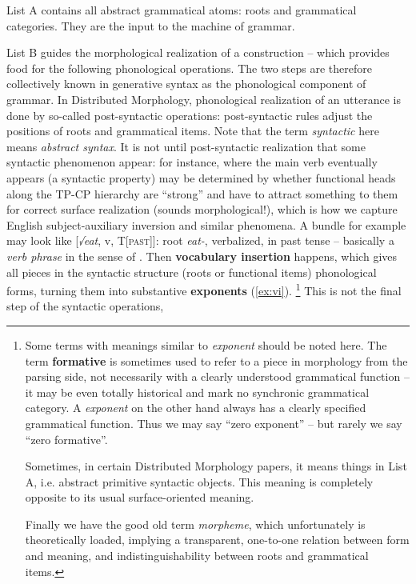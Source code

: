 \documentclass[a4paper, oneside, scheme=plain, 12pt]{article}
\newcommand*{\concept}[1]{\textbf{#1}}
\newcommand*{\term}[1]{\emph{#1}}
\newcommand{\form}[1]{\emph{#1}}
\newcommand*{\category}[1]{\textsc{#1}}
\begin{document}
List A contains all abstract grammatical atoms:
roots and grammatical categories.
They are the input to the machine of grammar.


List B guides the morphological realization of a construction --
which provides food for the following phonological operations.
The two steps are therefore collectively known in generative syntax as the phonological component of grammar.
In Distributed Morphology, phonological realization of an utterance
is done by so-called post-syntactic operations:
post-syntactic rules adjust the positions of roots and grammatical items.
Note that the term \term{syntactic} here means \emph{abstract syntax}.
It is not until post-syntactic realization that some syntactic phenomenon appear:
for instance, where the main verb eventually appears (a syntactic property) may be determined by
whether functional heads along the TP-CP hierarchy are ``strong''
and have to attract something to them for correct surface realization
(sounds morphological!),
which is how we capture English subject-auxiliary inversion and similar phenomena.
A bundle for example may look like [\form{√eat}, v, T[\category{past}]]:
root \form{eat-}, verbalized, in past tense -- basically a \term{verb phrase}
in the sense of .
Then \concept{vocabulary insertion} happens,
which gives all pieces in the syntactic structure (roots or functional items) phonological forms,
turning them into substantive \concept{exponents} (\ref{ex:vi}).%
\footnote{
    Some terms with meanings similar to \term{exponent} should be noted here.
    The term \concept{formative} is sometimes used to refer to a piece in morphology from the parsing side, not necessarily with a clearly understood grammatical function --
    it may be even totally historical and mark no synchronic grammatical category.
    A \term{exponent} on the other hand always has a clearly specified grammatical function.
    Thus we may say ``zero exponent'' -- but rarely we say ``zero formative''.

    Sometimes, in certain Distributed Morphology papers, it means things in List A,
    i.e. abstract primitive syntactic objects. 
    This meaning is completely opposite to its usual surface-oriented meaning.

    Finally we have the good old term \term{morpheme},
    which unfortunately is theoretically loaded, implying a transparent,
    one-to-one relation between form and meaning,
    and indistinguishability between roots and grammatical items.
}
This is not the final step of the syntactic operations,
\end{document}
